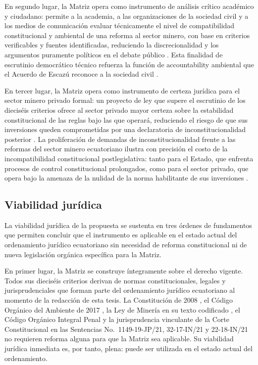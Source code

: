 En segundo lugar, la Matriz opera como instrumento de análisis crítico académico y ciudadano: permite a la academia, a las organizaciones de la sociedad civil y a los medios de comunicación evaluar técnicamente el nivel de compatibilidad constitucional y ambiental de una reforma al sector minero, con base en criterios verificables y fuentes identificadas, reduciendo la discrecionalidad y los argumentos puramente políticos en el debate público \parencite{lozano_espinosa_2023,ochoa_jimenez_2024}. Esta finalidad de escrutinio democrático técnico refuerza la función de accountability ambiental que el Acuerdo de Escazú reconoce a la sociedad civil \parencite{acuerdo_escazu_2018}.

En tercer lugar, la Matriz opera como instrumento de certeza jurídica para el sector minero privado formal: un proyecto de ley que supere el escrutinio de los dieciséis criterios ofrece al sector privado mayor certeza sobre la estabilidad constitucional de las reglas bajo las que operará, reduciendo el riesgo de que sus inversiones queden comprometidas por una declaratoria de inconstitucionalidad posterior \parencite{politica_publica_minera_2019,plan_nacional_sector_minero_2020}. La proliferación de demandas de inconstitucionalidad frente a las reformas del sector minero ecuatoriano ilustra con precisión el costo de la incompatibilidad constitucional postlegislativa: tanto para el Estado, que enfrenta procesos de control constitucional prolongados, como para el sector privado, que opera bajo la amenaza de la nulidad de la norma habilitante de sus inversiones \parencite{primicias_demandas_2026,primicias_aprobacion_2026}.

\subsection{Viabilidad jurídica}

La viabilidad jurídica de la propuesta se sustenta en tres órdenes de fundamentos que permiten concluir que el instrumento es aplicable en el estado actual del ordenamiento jurídico ecuatoriano sin necesidad de reforma constitucional ni de nueva legislación orgánica específica para la Matriz.

En primer lugar, la Matriz se construye íntegramente sobre el derecho vigente. Todos sus dieciséis criterios derivan de normas constitucionales, legales y jurisprudenciales que forman parte del ordenamiento jurídico ecuatoriano al momento de la redacción de esta tesis. La Constitución de 2008 \parencite{cre_2008}, el Código Orgánico del Ambiente de 2017 \parencite{coa_2017}, la Ley de Minería en su texto codificado \parencite{ley_mineria_2025}, el Código Orgánico Integral Penal \parencite{coip_2014} y la jurisprudencia vinculante de la Corte Constitucional en las Sentencias No.\ 1149-19-JP/21, 32-17-IN/21 y 22-18-IN/21 \parencite{cce_1149_19_jp_21,cce_32_17_in_21,cce_22_18_in_21} no requieren reforma alguna para que la Matriz sea aplicable. Su viabilidad jurídica inmediata es, por tanto, plena: puede ser utilizada en el estado actual del ordenamiento.

